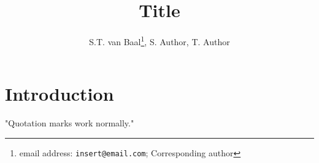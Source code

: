 \documentclass[12pt, letterpaper]{article}
\title{Title}
\author{S.T. van Baal\thanks{email address: \texttt{insert@email.com}; Corresponding author}, S. Author, T. Author}
\date{}
\newcommand{\beginsupplement}{%
        \setcounter{table}{0}
        \renewcommand{\thetable}{S\arabic{table}}%
        \setcounter{figure}{0}
        \renewcommand{\thefigure}{S\arabic{figure}}%
     }
\begin{document}
\maketitle

\begin{abstract}
    \noindent \lipsum[1]
\end{abstract}

\section{Introduction}

\lipsum[2]

"Quotation marks work normally."

\printbibliography

\beginsupplement
\end{document}

